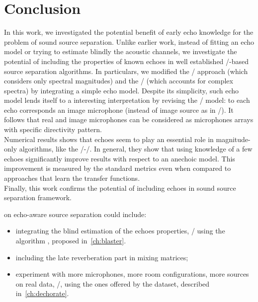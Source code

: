 \section{Conclusion}
In this work, we investigated the potential benefit of early echo knowledge for the problem of sound source separation.
Unlike earlier work, instead of fitting an echo model or trying to estimate blindly the acoustic channels,
we investigate the potential of including the properties of known echoes in well established \NMF/-based source separation algorithms.
In particulars, we modified the \MU/ approach (which considers only spectral magnitudes) and the \EM/ (which accounts for complex spectra) by integrating a simple echo model.
Despite its simplicity, such echo model lends itself to a interesting interpretation by revising the \ISM/ model:
to each echo corresponds an image microphone (instead of image source as in \ISM/).
It follows that real and image microphones can be considered as microphones arrays with specific directivity pattern.
\\Numerical results shows that echoes seem to play an essential role in magnitude-only algorithms, like the \MU/-\NMF/.
In general, they show that using knowledge of a few echoes significantly improve results with respect to an anechoic model.
This improvement is measured by the standard metrics even when compared to approaches that learn the transfer functions.
\\Finally, this work confirms the potential of including echoes in sound source separation framework.

 on echo-aware source separation could include:
\begin{itemize}
    \item integrating the blind estimation of the echoes properties, \eg/ using the algorithm \blaster{}, proposed in~\cref{ch:blaster}.
    \item including the late reverberation part in mixing matrices;
    \item experiment with more microphones, more room configurations, more sources on real data, \eg/, using the ones offered by the \dEchorate{} dataset, described in~\cref{ch:dechorate}.
\end{itemize}
